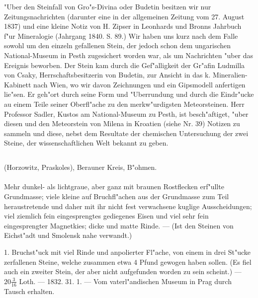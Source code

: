 \documentclass[a4paper, 11pt, oneside, polutonikogreek, german]{article}
\begin{document}
\setlength{\leftskip}{10mm}
\setlength{\parindent}{0pt}

{\footnotesize "Uber den Steinfall von Gro"s-Divina oder Budetin besitzen wir nur Zeitungsnachrichten (darunter eine in der allgemeinen Zeitung vom 27. August 1837) und eine kleine Notiz von H. Zipser in Leonhards und Bronns Jahrbuch f"ur Mineralogie (Jahrgang 1840. S. 89.) Wir haben uns kurz nach dem Falle sowohl um den einzeln gefallenen Stein, der jedoch schon dem ungarischen National-Museum in Pesth zugesichert worden war, als um Nachrichten "uber das Ereignis beworben. Der Stein kam durch die Gef"alligkeit der Gr"afin Ludmilla von Csaky, Herrschaftsbesitzerin von Budetin, zur Ansicht in das k. Mineralien-Kabinett nach Wien, wo wir davon Zeichnungen und ein Gipsmodell anfertigen lie"sen. Er geh"ort durch seine Form und "Uberrundung und durch die Eindr"ucke au einem Teile seiner Oberfl"ache zu den merkw"urdigsten Meteorsteinen. Herr Professor Sadler, Kustos am National-Museum zu Pesth, ist besch"aftiget, "uber diesen und den Meteorstein von Milena in Kroatien (siehe Nr. 39) Notizen zu sammeln und diese, nebst dem Resultate der chemischen Untersuchung der zwei Steine, der wissenschaftlichen Welt bekannt zu geben.}

\setlength{\leftskip}{0pt}
\setlength{\parindent}{20pt}

\subsection{}
\begin{center}

(Horzowitz, Praskoles), Berauner Kreis, B"ohmen.
\end{center}
\paragraph{}
Mehr dunkel- als lichtgraue, aber ganz mit braunen Rostflecken erf"ullte Grundmasse; viele kleine auf Bruchfl"achen aus der Grundmasse zum Teil heraustretende und daher mit ihr nicht fest verwachsene kuglige Ausscheidungen; viel ziemlich fein eingesprengtes gediegenes Eisen und viel sehr fein eingesprengter Magnetkies; dicke und matte Rinde. --- (Ist den Steinen von Eichst"adt und Smolensk nahe verwandt.)

1. Bruchst"uck mit viel Rinde und anpolierter Fl"ache, von einem in drei St"ucke zerfallenen Steine, welche zusammen etwa 4 Pfund gewogen haben sollen. (Es fiel auch ein zweiter Stein, der aber nicht aufgefunden worden zu sein scheint.) --- $\mathfrak{20\frac{3}{16}}$ Loth. --- 1832. 31. 1. --- Vom vaterl"andischen Museum in Prag durch Tausch erhalten.
\end{document}
